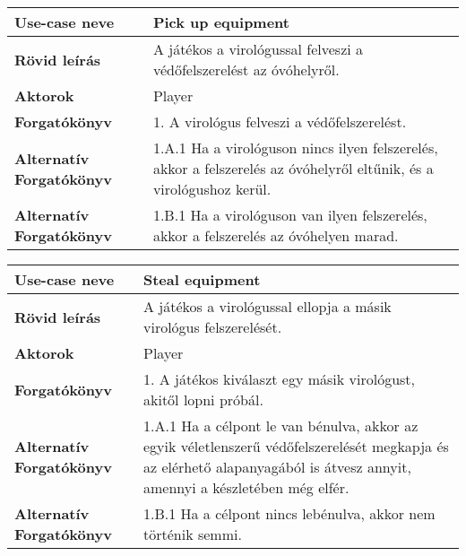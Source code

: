 \bigskip

\noindent\begin{tabularx}{\textwidth}{|l|X|}
	\hline
	\textbf{Use-case neve}           & \textbf{Pick up equipment}                                                                                          \\
	\hline
	\hline
	\textbf{Rövid leírás}            & A játékos a virológussal felveszi a védőfelszerelést az óvóhelyről.                                                 \\
	\hline
	\textbf{Aktorok}                 & Player                                                                                                              \\
	\hline
	\textbf{Forgatókönyv}            & 1. A virológus felveszi a védőfelszerelést.                                                                         \\
	\hline
	\textbf{Alternatív Forgatókönyv} & 1.A.1 Ha a virológuson nincs ilyen felszerelés, akkor a felszerelés az óvóhelyről eltűnik, és a virológushoz kerül. \\
	\hline
	\textbf{Alternatív Forgatókönyv} & 1.B.1 Ha a virológuson van ilyen felszerelés, akkor a felszerelés az óvóhelyen marad.                               \\
	\hline
\end{tabularx}

\bigskip

\noindent\begin{tabularx}{\textwidth}{|l|X|}
	\hline
	\textbf{Use-case neve}           & \textbf{Steal equipment}                                                                                                                                                   \\
	\hline
	\hline
	\textbf{Rövid leírás}            & A játékos a virológussal ellopja a másik virológus felszerelését.                                                                                                          \\
	\hline
	\textbf{Aktorok}                 & Player                                                                                                                                                                     \\
	\hline
	\textbf{Forgatókönyv}            & 1. A játékos kiválaszt egy másik virológust, akitől lopni próbál.                                                                                                          \\
	\hline
	\textbf{Alternatív Forgatókönyv} & 1.A.1 Ha a célpont le van bénulva, akkor az egyik véletlenszerű védőfelszerelését megkapja és az elérhető alapanyagából is átvesz annyit, amennyi a készletében még elfér. \\
	\hline
	\textbf{Alternatív Forgatókönyv} & 1.B.1 Ha a célpont nincs lebénulva, akkor nem történik semmi.                                                                                                              \\
	\hline
\end{tabularx}

